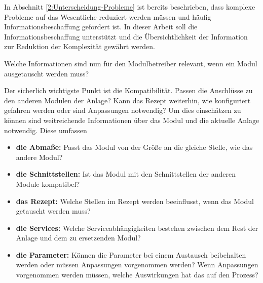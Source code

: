 In Abschnitt \ref{2:Unterscheidung-Probleme} ist bereits beschrieben, dass komplexe Probleme auf das Wesentliche reduziert werden müssen und häufig Informationsbeschaffung gefordert ist. In dieser Arbeit soll die Informationsbeschaffung unterstützt und die Übersichtlichkeit der Information zur Reduktion der Komplexität gewährt werden.

Welche Informationen sind nun für den Modulbetreiber relevant, wenn ein Modul ausgetauscht werden muss?

Der sicherlich wichtigste Punkt ist die Kompatibilität. Passen die Anschlüsse zu den anderen Modulen der Anlage? Kann das Rezept weiterhin, wie konfiguriert gefahren werden oder sind Anpassungen notwendig? Um dies einschätzen zu können sind weitreichende Informationen über das Modul und die aktuelle Anlage notwendig. Diese umfassen
\begin{itemize}
\item \textbf{die Abmaße:} Passt das Modul von der Größe an die gleiche Stelle, wie das andere Modul?
\item \textbf{die Schnittstellen:} Ist das Modul mit den Schnittstellen der anderen Module kompatibel?
\item \textbf{das Rezept:} Welche Stellen im Rezept werden beeinflusst, wenn das Modul getauscht werden muss?
\item \textbf{die Services:} Welche Serviceabhängigkeiten bestehen zwischen dem Rest der Anlage und dem zu ersetzenden Modul?
\item \textbf{die Parameter:} Können die Parameter bei einem Austausch beibehalten werden oder müssen Anpassungen vorgenommen werden? Wenn Anpassungen vorgenommen werden müssen, welche Auswirkungen hat das auf den Prozess?
\end{itemize}


